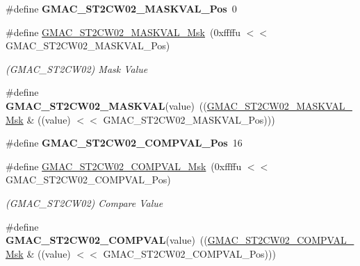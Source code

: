 \begin{DoxyCompactItemize}
\#define {\bfseries G\+M\+A\+C\+\_\+\+S\+T2\+C\+W02\+\_\+\+M\+A\+S\+K\+V\+A\+L\+\_\+\+Pos}~0
\item 
\mbox{\label{group__SAME70__GMAC_gab6ec87c6d8088f6315c48c31740e84fe}} 
\#define \mbox{\hyperlink{group__SAME70__GMAC_gab6ec87c6d8088f6315c48c31740e84fe}{G\+M\+A\+C\+\_\+\+S\+T2\+C\+W02\+\_\+\+M\+A\+S\+K\+V\+A\+L\+\_\+\+Msk}}~(0xffffu $<$$<$ G\+M\+A\+C\+\_\+\+S\+T2\+C\+W02\+\_\+\+M\+A\+S\+K\+V\+A\+L\+\_\+\+Pos)
\begin{DoxyCompactList}\small\item\em (G\+M\+A\+C\+\_\+\+S\+T2\+C\+W02) Mask Value \end{DoxyCompactList}\item 
\mbox{\label{group__SAME70__GMAC_ga47bd2e93b68127a91b07f47ceca616f7}} 
\#define {\bfseries G\+M\+A\+C\+\_\+\+S\+T2\+C\+W02\+\_\+\+M\+A\+S\+K\+V\+AL}(value)~((\mbox{\hyperlink{group__SAMV71__GMAC_gab6ec87c6d8088f6315c48c31740e84fe}{G\+M\+A\+C\+\_\+\+S\+T2\+C\+W02\+\_\+\+M\+A\+S\+K\+V\+A\+L\+\_\+\+Msk}} \& ((value) $<$$<$ G\+M\+A\+C\+\_\+\+S\+T2\+C\+W02\+\_\+\+M\+A\+S\+K\+V\+A\+L\+\_\+\+Pos)))
\item 
\mbox{\label{group__SAME70__GMAC_gab424079c23d98f8a6c6e49f6665a3323}} 
\#define {\bfseries G\+M\+A\+C\+\_\+\+S\+T2\+C\+W02\+\_\+\+C\+O\+M\+P\+V\+A\+L\+\_\+\+Pos}~16
\item 
\mbox{\label{group__SAME70__GMAC_ga9b6ea006951e9fd1a44e771612150433}} 
\#define \mbox{\hyperlink{group__SAME70__GMAC_ga9b6ea006951e9fd1a44e771612150433}{G\+M\+A\+C\+\_\+\+S\+T2\+C\+W02\+\_\+\+C\+O\+M\+P\+V\+A\+L\+\_\+\+Msk}}~(0xffffu $<$$<$ G\+M\+A\+C\+\_\+\+S\+T2\+C\+W02\+\_\+\+C\+O\+M\+P\+V\+A\+L\+\_\+\+Pos)
\begin{DoxyCompactList}\small\item\em (G\+M\+A\+C\+\_\+\+S\+T2\+C\+W02) Compare Value \end{DoxyCompactList}\item 
\mbox{\label{group__SAME70__GMAC_ga8da92c689de6e7c0e2697fac41eaa644}} 
\#define {\bfseries G\+M\+A\+C\+\_\+\+S\+T2\+C\+W02\+\_\+\+C\+O\+M\+P\+V\+AL}(value)~((\mbox{\hyperlink{group__SAMV71__GMAC_ga9b6ea006951e9fd1a44e771612150433}{G\+M\+A\+C\+\_\+\+S\+T2\+C\+W02\+\_\+\+C\+O\+M\+P\+V\+A\+L\+\_\+\+Msk}} \& ((value) $<$$<$ G\+M\+A\+C\+\_\+\+S\+T2\+C\+W02\+\_\+\+C\+O\+M\+P\+V\+A\+L\+\_\+\+Pos)))

\end{DoxyCompactItemize}
